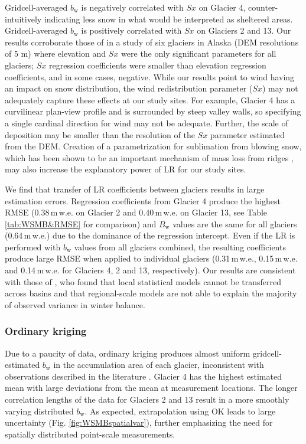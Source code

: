 \documentclass[review,oneside, letterpaper]{igs}
\begin{document}
Gridcell-averaged $b_\mathrm{w}$ is negatively correlated with $Sx$ on Glacier 4, counter-intuitively indicating less snow in what would be interpreted as sheltered areas. Gridcell-averaged $b_\mathrm{w}$ is positively correlated with $Sx$ on Glaciers 2 and 13. Our results corroborate those of \cite{McGrath2015} in a study of six glaciers in Alaska (DEM resolutions of 5 m) where elevation and $Sx$ were the only significant parameters for all glaciers; $Sx$ regression coefficients were smaller than elevation regression coefficients, and in some cases, negative. While our results point to wind having an impact on snow distribution, the wind redistribution parameter ($Sx$) may not adequately capture these effects at our study sites. For example, Glacier 4 has a curvilinear plan-view profile and is surrounded by steep valley walls, so specifying a single cardinal direction for wind may not be adequate. Further, the scale of deposition may be smaller than the resolution of the $Sx$ parameter estimated from the DEM. Creation of a parametrization for sublimation from blowing snow, which has been shown to be an important mechanism of mass loss from ridges \citep[e.g.][]{Musselman2015}, may also increase the explanatory power of LR for our study sites.

We find that transfer of LR coefficients between glaciers results in large estimation errors. Regression coefficients from Glacier 4 produce the highest RMSE (0.38\,m\,w.e. on Glacier 2 and 0.40\,m\,w.e. on Glacier 13, see Table \ref{tab:WSMB&RMSE} for comparison) and $B_\mathrm{w}$ values are the same for all glaciers (0.64\,m\,w.e.) due to the dominance of the regression intercept. Even if the LR is performed with $b_\mathrm{w}$ values from all glaciers combined, the resulting coefficients produce large RMSE when applied to  individual glaciers (0.31\,m\,w.e., 0.15\,m\,w.e. and 0.14\,m\,w.e. for Glaciers 4, 2 and 13, respectively). Our results are consistent with those of \cite{Grunewald2013}, who found that local statistical models cannot be transferred across basins and that regional-scale models are not able to explain the majority of observed variance in winter balance. 

\subsubsection{Ordinary kriging}

Due to a paucity of data, ordinary kriging produces almost uniform gridcell-estimated $b_\mathrm{w}$ in the accumulation area of each glacier, inconsistent with observations described in the literature \citep[e.g.][]{Machguth2006, Grabiec2011}. Glacier 4 has the highest estimated mean with large deviations from the mean at measurement locations. The longer correlation lengths of the data for Glaciers 2 and 13 result in a more smoothly varying distributed $b_\mathrm{w}$. As expected, extrapolation using OK leads to large uncertainty (Fig. \ref{fig:WSMBspatialvar}), further emphasizing the need for spatially distributed point-scale measurements. 
\end{document}
